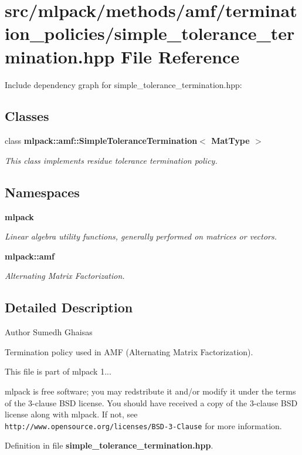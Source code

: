 \section{src/mlpack/methods/amf/termination\-\_\-policies/simple\-\_\-tolerance\-\_\-termination.hpp File Reference}
\label{simple__tolerance__termination_8hpp}
Include dependency graph for simple\-\_\-tolerance\-\_\-termination.\-hpp\-:
\subsection*{Classes}
\begin{DoxyCompactItemize}
\item 
class {\bf mlpack\-::amf\-::\-Simple\-Tolerance\-Termination$<$ Mat\-Type $>$}
\begin{DoxyCompactList}\small\item\em This class implements residue tolerance termination policy. \end{DoxyCompactList}\end{DoxyCompactItemize}
\subsection*{Namespaces}
\begin{DoxyCompactItemize}
\item 
{\bf mlpack}
\begin{DoxyCompactList}\small\item\em Linear algebra utility functions, generally performed on matrices or vectors. \end{DoxyCompactList}\item 
{\bf mlpack\-::amf}
\begin{DoxyCompactList}\small\item\em Alternating Matrix Factorization. \end{DoxyCompactList}\end{DoxyCompactItemize}


\subsection{Detailed Description}
\begin{DoxyAuthor}{Author}
Sumedh Ghaisas
\end{DoxyAuthor}
Termination policy used in A\-M\-F (Alternating Matrix Factorization).

This file is part of mlpack 1...

mlpack is free software; you may redstribute it and/or modify it under the terms of the 3-\/clause B\-S\-D license. You should have received a copy of the 3-\/clause B\-S\-D license along with mlpack. If not, see {\tt http\-://www.\-opensource.\-org/licenses/\-B\-S\-D-\/3-\/\-Clause} for more information. 

Definition in file {\bf simple\-\_\-tolerance\-\_\-termination.\-hpp}.

